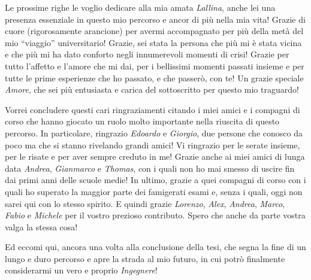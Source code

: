 \begin{acknowledgements}
  Le prossime righe le voglio dedicare alla mia amata \emph{Lallina}, anche lei una presenza essenziale in questo mio percorso e ancor di più nella mia vita! Grazie di cuore (rigorosamente arancione) per avermi accompagnato per più della metà del mio ``viaggio'' universitario! Grazie, sei stata la persona che più mi è stata vicina e che più mi ha dato conforto negli innumerevoli momenti di crisi! Grazie per tutto l'affetto e l'amore che mi dai, per i bellissimi momenti passati insieme e per tutte le prime esperienze che ho passato, e che passerò, con te! Un grazie speciale \emph{Amore}, che sei più entusiasta e carica del sottoscritto per questo mio traguardo!

  Vorrei concludere questi cari ringraziamenti citando i miei amici e i compagni di corso che hanno giocato un ruolo molto importante nella riuscita di questo percorso.
  In particolare, ringrazio \emph{Edoardo} e \emph{Giorgio}, due persone che conosco da poco ma che si stanno rivelando grandi amici! Vi ringrazio per le serate insieme, per le risate e per aver sempre creduto in me! Grazie anche ai miei amici di lunga data \emph{Andrea}, \emph{Gianmarco} e \emph{Thomas}, con i quali non ho mai smesso di uscire fin dai primi anni delle scuole medie! In ultimo, grazie a quei compagni di corso con i quali ho superato la maggior parte dei famigerati esami e, senza i quali, oggi non sarei qui con lo stesso spirito. E quindi grazie \emph{Lorenzo}, \emph{Alex}, \emph{Andrea}, \emph{Marco}, \emph{Fabio} e \emph{Michele} per il vostro prezioso contributo. Spero che anche da parte vostra valga la stessa cosa!

  Ed eccomi qui, ancora una volta alla conclusione della tesi, che segna la fine di un lungo e duro percorso e apre la strada al mio futuro, in cui potrò finalmente considerarmi un vero e proprio \textit{Ingegnere}!
\end{acknowledgements}